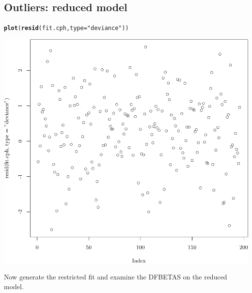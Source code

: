 \documentclass{article}\usepackage[]{graphicx}\usepackage[]{color}
\makeatletter
\def\maxwidth{ %
  \ifdim\Gin@nat@width>\linewidth
    \linewidth
  \else
    \Gin@nat@width
  \fi
}
\newcommand{\hlstr}[1]{\textcolor[rgb]{0.192,0.494,0.8}{#1}}%
\newcommand{\hlstd}[1]{\textcolor[rgb]{0.345,0.345,0.345}{#1}}%
\newcommand{\hlkwc}[1]{\textcolor[rgb]{0.333,0.667,0.333}{#1}}%
\newcommand{\hlkwd}[1]{\textcolor[rgb]{0.737,0.353,0.396}{\textbf{#1}}}%
\newenvironment{kframe}{%
 \def\at@end@of@kframe{}%
 \ifinner\ifhmode%
  \def\at@end@of@kframe{\end{minipage}}%
  \begin{minipage}{\columnwidth}%
 \fi\fi%
 \def\FrameCommand##1{\hskip\@totalleftmargin \hskip-\fboxsep
 \colorbox{shadecolor}{##1}\hskip-\fboxsep
     \hskip-\linewidth \hskip-\@totalleftmargin \hskip\columnwidth}%
 \MakeFramed {\advance\hsize-\width
   \@totalleftmargin\z@ \linewidth\hsize
   \@setminipage}}%
 {\par\unskip\endMakeFramed%
 \at@end@of@kframe}
\newenvironment{knitrout}{}{} %
\makeatother
\begin{document}
\subsection{Outliers: reduced model}
\begin{knitrout}
\color{fgcolor}\begin{kframe}
\begin{alltt}
\hlkwd{plot}\hlstd{(}\hlkwd{resid}\hlstd{(fit.cph,} \hlkwc{type} \hlstd{=} \hlstr{"deviance"}\hlstd{))}
\end{alltt}
\end{kframe}

{\centering \includegraphics[width=\maxwidth]{figure/05-eda-outliers-reduced-1} 

}



\end{knitrout}

Now generate the restricted fit and examine the DFBETAS on the reduced model.
\end{document}
